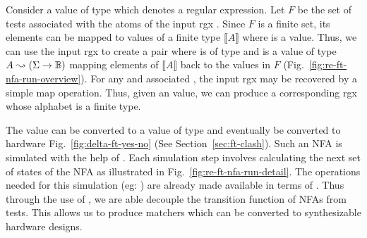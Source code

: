 Consider a value  of type  which denotes
a regular expression.
Let $F$ be the set of tests associated with the atoms of the input
\gls{rgx} .
Since $F$ is a finite set, its elements
can be mapped to values of a finite type $⟦A⟧$ where  is a
 value.
%
Thus, we can use the input \gls{rgx}  to create a pair
 where  is of type  and 
is a value of type $A \mathrel{\leadsto} (\Sigma \to \mathbb{B})$ mapping elements
of $⟦A⟧$ back to the values in $F$
(Fig.~\ref{fig:re-ft-nfa-run-overview}).
%
For any  and associated , the input \gls{rgx}
 may be recovered by a simple map operation.
Thus, given an  value, we can produce a
corresponding \gls{rgx} whose alphabet is a finite type.

%
The  value can be converted to a value of type 
and eventually be converted to hardware %
Fig.~\ref{fig:delta-ft-yes-no} (See Section~\ref{sec:ft-clash}).
%
Such an \gls{NFA} is simulated with the help of .
Each simulation step involves calculating the next set of states of
the \gls{NFA} as
illustrated in Fig.~\ref{fig:re-ft-nfa-run-detail}.
The operations needed for this simulation (eg: ) are
already made available in terms of .
%
Thus through the use of , we are able decouple the transition
function of \glspl{NFA} from tests.
This allows us to produce matchers which can be converted to
synthesizable hardware designs.


